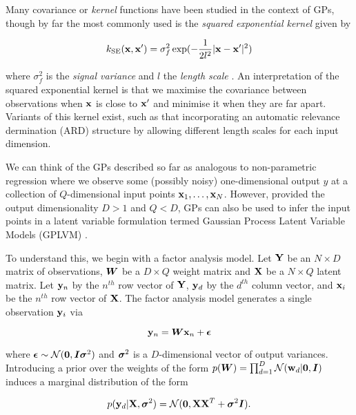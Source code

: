 Many covariance or \emph{kernel} functions have been studied in the context of GPs, though by far the most commonly used is the \emph{squared exponential kernel} given by

 \begin{equation}
 	k_{\text{SE}}({\bf x}, {\bf x}') = \sigma_f^2 \exp(-\frac{1}{2l^2}|{\bf x} - {\bf x}'|^2)
 \end{equation}

 where $\sigma_f^2$ is the \emph{signal variance} and $l$ the \emph{length scale} \cite{rasmussen2006gaussian}. An interpretation of the squared exponential kernel is that we maximise the covariance between observations when ${\bf x}$ is close to ${\bf x}'$ and minimise it when they are far apart. Variants of this kernel exist, such as that incorporating an automatic relevance dermination (ARD) structure by allowing different length scales for each input dimension.

 We can think of the GPs described so far as analogous to non-parametric regression where we observe some (possibly noisy) one-dimensional output $y$ at a collection of $Q$-dimensional input points ${\bf x}_1, \ldots, {\bf x}_N$. However, provided the output dimensionality $D > 1$ and $Q < D$, GPs can also be used to infer the input points in a latent variable formulation termed Gaussian Process Latent Variable Models (GPLVM) \cite{lawrence2005probabilistic}.

 To understand this, we begin with a factor analysis model. Let ${\bf Y}$ be an $N \times D$ matrix of observations, ${\bm W}$ be a $D \times Q$ weight matrix and ${\bf X}$ be a $N \times Q$ latent matrix. Let ${\bf y}_n$ by the $n^{th}$ row vector of ${\bf Y}$, ${\bf y}_d$ by the $d^{th}$ column vector, and ${\bf x}_i$ be the $n^{th}$ row vector of ${\bf X}$. The factor analysis model generates a single observation ${\bf y}_i$ via

 \begin{equation}
 	{\bf y}_n = {\bm W} {\bf x}_n + {\bm\epsilon}
 \end{equation}

 where ${\bm \epsilon} \sim \mathcal{N}({\bm 0}, {\bm I} {\bm \sigma}^2)$ and ${\bm \sigma}^2$ is a $D$-dimensional vector of output variances. Introducing a prior over the weights of the form $p({\bm W}) = \prod_{d=1}^D \mathcal{N}({\bf w}_d| {\bm 0}, {\bm I})$ induces a marginal distribution of the form

 \begin{equation}
 	p({\bf y}_d | {\bf X}, {\bm \sigma}^2) = \mathcal{N}({\bm 0}, {\bf X} {\bf X}^T + {\bm \sigma}^2 {\bm I}).
 \end{equation}

